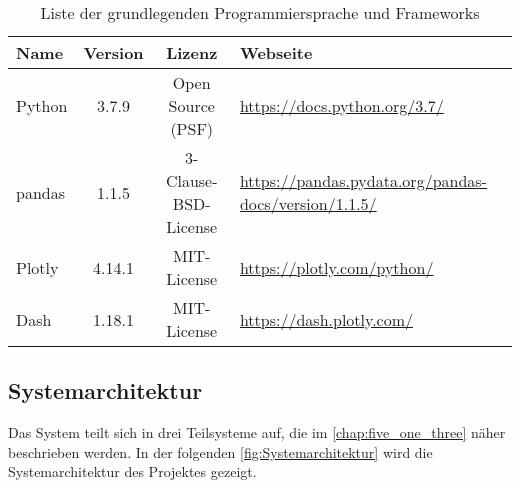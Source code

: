     \begingroup
        \setlength{\tabcolsep}{4pt} %
        \renewcommand{\arraystretch}{1.5}
        \begin{table}[H]
            \centering
            \begin{adjustbox}{max width=\textwidth}
            \Huge
            \begin{tabular}{lccl}
               \toprule
               \textbf{Name}             &{Version}    &\textbf{Lizenz}                        & \textbf{Webseite}\\
               \midrule     
                    Python               &3.7.9         &Open Source (PSF)                     & \url{https://docs.python.org/3.7/}\\
                    pandas               &1.1.5         &3-Clause-BSD-License                  & \url{https://pandas.pydata.org/pandas-docs/version/1.1.5/}\\
                    Plotly               &4.14.1       &MIT-License                           & \url{https://plotly.com/python/}\\
                    Dash                 &1.18.1        &MIT-License                           & \url{https://dash.plotly.com/}\\


                \bottomrule
            \end{tabular}
            \end{adjustbox}
            \caption{%
                Liste der grundlegenden Programmiersprache und Frameworks
            \label{tab:Software-Requirements}
            }
             \end{table}
        \endgroup
    
     
    \subsection{Systemarchitektur}
    
    Das System teilt sich in drei Teilsysteme auf, die im \autoref{chap:five_one_three} näher beschrieben werden. 
    In der folgenden \autoref{fig:Systemarchitektur} wird die Systemarchitektur des Projektes gezeigt.

